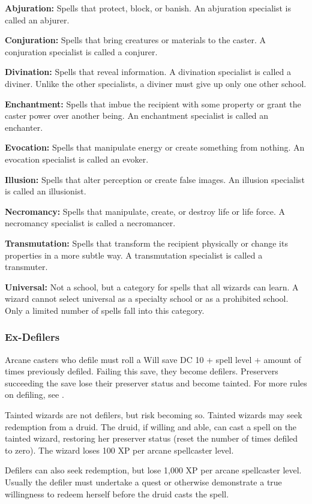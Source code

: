 \textbf{Abjuration:} Spells that protect, block, or banish. An abjuration specialist is called an abjurer.

\textbf{Conjuration:} Spells that bring creatures or materials to the caster. A conjuration specialist is called a conjurer.

\textbf{Divination:} Spells that reveal information. A divination specialist is called a diviner. Unlike the other specialists, a diviner must give up only one other school.

\textbf{Enchantment:} Spells that imbue the recipient with some property or grant the caster power over another being. An enchantment specialist is called an enchanter.

\textbf{Evocation:} Spells that manipulate energy or create something from nothing. An evocation specialist is called an evoker.

\textbf{Illusion:} Spells that alter perception or create false images. An illusion specialist is called an illusionist.

\textbf{Necromancy:} Spells that manipulate, create, or destroy life or life force. A necromancy specialist is called a necromancer.

\textbf{Transmutation:} Spells that transform the recipient physically or change its properties in a more subtle way. A transmutation specialist is called a transmuter.

\textbf{Universal:} Not a school, but a category for spells that all wizards can learn. A wizard cannot select universal as a specialty school or as a prohibited school. Only a limited number of spells fall into this category.

\subsubsection{Ex-Defilers}
Arcane casters who defile must roll a Will save DC 10 + spell level + amount of times previously defiled. Failing this save, they become defilers. Preservers succeeding the save lose their preserver status and become tainted. For more rules on defiling, see .

Tainted wizards are not defilers, but risk becoming so. Tainted wizards may seek redemption from a druid. The druid, if willing and able, can cast a  spell on the tainted wizard, restoring her preserver status (reset the number of times defiled to zero). The wizard loses 100 XP per arcane spellcaster level.

Defilers can also seek redemption, but lose 1,000 XP per arcane spellcaster level. Usually the defiler must undertake a quest or otherwise demonstrate a true willingness to redeem herself before the druid casts the  spell.


